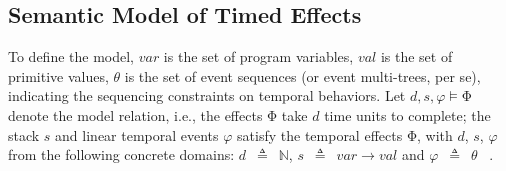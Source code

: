 \documentclass[acmsmall,10pt,review]{acmart}
\newcommand{\es}{\theta}
\newcommand{\effect}{{\ensuremath{\mathrm{\Phi}}}}
\newcommand{\code}[1]{{\tt{\ensuremath{\m{#1}}}}}
\newcommand{\m}{\mathit}
\def\defeq{\ensuremath{\,\triangleq}}
\begin{document}
{\subsection{Semantic Model of Timed Effects}
\label{subsec:Specification_Semantics}


To define the model, 
\code{var} is the set of program variables, 
\code{val} is the set of primitive values, 
\code{\es} is the set of event sequences (or event multi-trees, per se), 
indicating the sequencing constraints on temporal behaviors.
Let \code{d, s, \varphi \models \effect} denote the model relation, i.e., 
the effects \code{\effect} take \code{d} time units to complete; 
the stack \code{s} and linear temporal events \code{\varphi} satisfy the 
temporal effects \code{\effect}, with \code{d}, \code{s}, \code{\varphi} 
from the following concrete domains: \code{d}  {\defeq}\  \code{\mathbb{N}}, 
\code{s}  \defeq\  \code{var {\rightarrow} val } and \code{\varphi}   \defeq\ \code{\es} \ .



}
\end{document}
